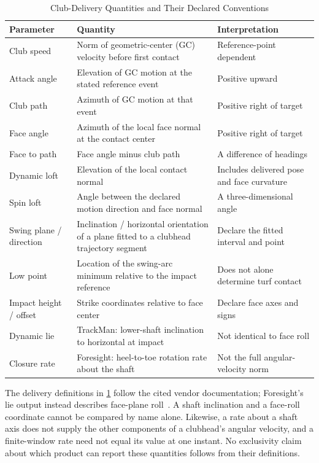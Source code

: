 \begin{table}[htbp]
\centering\small
\caption{Club-Delivery Quantities and Their Declared Conventions}
\label{tab:clubparams}
\begin{tabular}{@{}p{3.0cm}p{7.0cm}p{4.6cm}@{}}
\toprule
\textbf{Parameter} & \textbf{Quantity} & \textbf{Interpretation} \\
\midrule
Club speed & Norm of geometric-center (GC) velocity before first contact & Reference-point dependent \\
Attack angle & Elevation of GC motion at the stated reference event & Positive upward \\
Club path & Azimuth of GC motion at that event & Positive right of target \\
Face angle & Azimuth of the local face normal at the contact center & Positive right of target \\
Face to path & Face angle minus club path & A difference of headings \\
Dynamic loft & Elevation of the local contact normal & Includes delivered pose and face curvature \\
Spin loft & Angle between the declared motion direction and face normal & A three-dimensional angle \\
Swing plane / direction & Inclination / horizontal orientation of a plane fitted to a clubhead trajectory segment & Declare the fitted interval and point \\
Low point & Location of the swing-arc minimum relative to the impact reference & Does not alone determine turf contact \\
Impact height / offset & Strike coordinates relative to face center & Declare face axes and signs \\
Dynamic lie & TrackMan: lower-shaft inclination to horizontal at impact & Not identical to face roll \\
Closure rate & Foresight: heel-to-toe rotation rate about the shaft & Not the full angular-velocity norm \\
\bottomrule
\end{tabular}
\end{table}

The delivery definitions in \cref{tab:clubparams} follow the cited vendor documentation; Foresight's lie output instead describes face-plane roll~\cite{trackmanparameterdefinitions,foresightclubdefinitions}.
A shaft inclination and a face-roll coordinate cannot be compared by name alone.
Likewise, a rate about a shaft axis does not supply the other components of a clubhead's angular velocity, and a finite-window rate need not equal its value at one instant.
No exclusivity claim about which product can report these quantities follows from their definitions.


